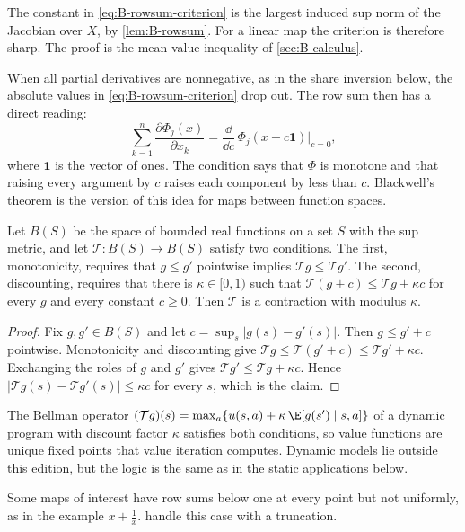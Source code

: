 The constant in \eqref{eq:B-rowsum-criterion} is the largest induced sup norm of the Jacobian over $X$, by
\cref{lem:B-rowsum}. For a linear map the criterion is therefore sharp. The proof is the mean value
inequality of \cref{sec:B-calculus}.

When all partial derivatives are nonnegative, as in the share inversion below, the absolute values in
\eqref{eq:B-rowsum-criterion} drop out. The row sum then has a direct reading:
\begin{equation*}
  \sum_{k=1}^{n}\frac{\partial\Phi_j(x)}{\partial x_k} = \frac{\dd}{\dd c}\,\Phi_j(x + c\mathbf{1})\Big|_{c=0},
\end{equation*}
where $\mathbf{1}$ is the vector of ones. The condition says that $\Phi$ is monotone and that raising every
argument by $c$ raises each component by less than $c$. Blackwell's theorem is the version of this idea for
maps between function spaces.

\begin{theorem}\label{thm:B-blackwell}
Let $B(S)$ be the space of bounded real functions on a set $S$ with the sup metric, and let $\mathcal{T}:
B(S) \to B(S)$ satisfy two conditions. The first, monotonicity, requires that $g \leq g'$ pointwise implies
$\mathcal{T}g \leq \mathcal{T}g'$. The second, discounting, requires that there is $\kappa \in [0,1)$ such that $\mathcal{T}(g + c) \leq \mathcal{T}g +
\kappa c$ for every $g$ and every constant $c \geq 0$. Then $\mathcal{T}$ is a contraction with modulus $\kappa$.
\end{theorem}

\begin{proof}
Fix $g, g' \in B(S)$ and let $c = \sup_s|g(s) - g'(s)|$. Then $g \leq g' + c$ pointwise. Monotonicity and
discounting give $\mathcal{T}g \leq \mathcal{T}(g' + c) \leq \mathcal{T}g' + \kappa c$. Exchanging the roles
of $g$ and $g'$ gives $\mathcal{T}g' \leq \mathcal{T}g + \kappa c$. Hence $|\mathcal{T}g(s) - \mathcal{T}g'(s)|
\leq \kappa c$ for every $s$, which is the claim.
\end{proof}

The Bellman operator $(\mathcal{T}g)(s) = \max_a\{u(s, a) + \kappa\,\E[g(s') \mid s, a]\}$ of a dynamic program
with discount factor $\kappa$ satisfies both conditions, so value functions are unique fixed points that
value iteration computes. Dynamic models lie outside this edition, but the logic is the same as in the
static applications below.

Some maps of interest have row sums below one at every point but not uniformly, as in the example $x +
\frac{1}{x}$.  handle this case with a truncation.

